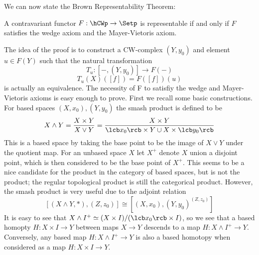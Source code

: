We can now state the Brown Representability Theorem:
\begin{lem}[Brown]
A contravariant functor $F : \hCWp \rightarrow \Setp$ is representable if and only if $F$ satisfies the wedge axiom and the Mayer-Vietoris axiom.
\end{lem}

The idea of the proof is to construct a CW-complex $(Y,y_0)$ and element $u \in F(Y)$ such that the natural transformation
\[ T_u : [ - , (Y,y_0)] \longrightarrow F(-) \]
\[ T_u(X)([f]) = F([f])(u) \]
is actually an equivalence. The necessity of F to satisfiy the wedge and Mayer-Vietoris axioms is easy enough to prove. First we recall some basic constructions. For based spaces $(X,x_0),(Y,y_0)$ the smash product is defined to be
\[ X \wedge Y = \frac{X \times Y}{X \vee Y} = \frac{X \times Y}{\lcb x_0 \rcb \times Y \cup X \times \lcb y_0 \rcb} \]
This is a based space by taking the base point to be the image of $X \vee Y$ under the quotient map. For an unbased space $X$ let $X^+$ denote $X$ union a disjoint point, which is then considered to be the base point of $X^+$. This seems to be a nice candidate for the product in the category of based spaces, but is not the product; the regular topological product is still the categorical product. However, the smash product is very useful due to the adjoint relation
\begin{equation}
\label{smashmapadjoint}
[(X \wedge Y,*),(Z,z_0)] \cong [(X,x_0), (Y,y_0)^{(Z,z_0)}] 
\end{equation}
It is easy to see that $X \wedge I^+ \simeq (X \times I) / (\lcb x_0 \rcb \times I)$, so we see that a based homopty $H : X \times I \rightarrow Y$ between maps $X \rightarrow Y$ descends to a map $H : X \wedge I^+ \rightarrow Y$. Conversely, any based map $H : X \wedge I^+ \rightarrow Y$ is also a based homotopy when considered as a map $H : X \times I \rightarrow Y$.

